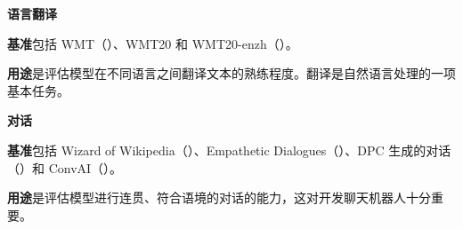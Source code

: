 \medskip\noindent\textbf{语言翻译}\par\nobreak
\textbf{基准}包括 WMT（）、WMT20 和 WMT20-enzh（）。
\par\textbf{用途}是评估模型在不同语言之间翻译文本的熟练程度。翻译是自然语言处理的一项基本任务。

\medskip\noindent\textbf{对话}\par\nobreak
\textbf{基准}包括 Wizard of Wikipedia（）、Empathetic Dialogues（）、DPC 生成的对话（）和 ConvAI（）。
\par\textbf{用途}是评估模型进行连贯、符合语境的对话的能力，这对开发聊天机器人十分重要。
